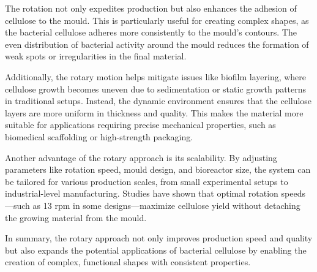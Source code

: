 The rotation not only expedites production but also enhances the adhesion of cellulose to the mould. This is particularly useful for creating complex shapes, as the bacterial cellulose adheres more consistently to the mould's contours. The even distribution of bacterial activity around the mould reduces the formation of weak spots or irregularities in the final material.

Additionally, the rotary motion helps mitigate issues like biofilm layering, where cellulose growth becomes uneven due to sedimentation or static growth patterns in traditional setups. Instead, the dynamic environment ensures that the cellulose layers are more uniform in thickness and quality. This makes the material more suitable for applications requiring precise mechanical properties, such as biomedical scaffolding or high-strength packaging.

Another advantage of the rotary approach is its scalability. By adjusting parameters like rotation speed, mould design, and bioreactor size, the system can be tailored for various production scales, from small experimental setups to industrial-level manufacturing. Studies have shown that optimal rotation speeds—such as 13 rpm in some designs—maximize cellulose yield without detaching the growing material from the mould.

In summary, the rotary approach not only improves production speed and quality but also expands the potential applications of bacterial cellulose by enabling the creation of complex, functional shapes with consistent properties.